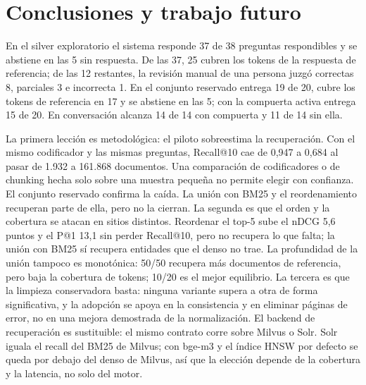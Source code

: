 \section{Conclusiones y trabajo futuro}
\label{sec:conclusiones}

En el silver exploratorio el sistema responde 37 de 38 preguntas respondibles y se abstiene en las 5 sin respuesta. De las 37, 25 cubren los tokens de la respuesta de referencia; de las 12 restantes, la revisi\'on manual de una persona juzg\'o correctas 8, parciales 3 e incorrecta 1. En el conjunto reservado entrega 19 de 20, cubre los tokens de referencia en 17 y se abstiene en las 5; con la compuerta activa entrega 15 de 20. En conversaci\'on alcanza 14 de 14 con compuerta y 11 de 14 sin ella.

La primera lecci\'on es metodol\'ogica: el piloto sobreestima la recuperaci\'on. Con el mismo codificador y las mismas preguntas, Recall@10 cae de 0,947 a 0,684 al pasar de 1.932 a 161.868 documentos. Una comparaci\'on de codificadores o de chunking hecha solo sobre una muestra peque\~na no permite elegir con confianza. El conjunto reservado confirma la ca\'ida. La uni\'on con BM25 y el reordenamiento recuperan parte de ella, pero no la cierran. La segunda es que el orden y la cobertura se atacan en sitios distintos. Reordenar el top-5 sube el nDCG 5,6 puntos y el P@1 13,1 sin perder Recall@10, pero no recupera lo que falta; la uni\'on con BM25 s\'i recupera entidades que el denso no trae. La profundidad de la uni\'on tampoco es monot\'onica: 50/50 recupera m\'as documentos de referencia, pero baja la cobertura de tokens; 10/20 es el mejor equilibrio. La tercera es que la limpieza conservadora basta: ninguna variante supera a otra de forma significativa, y la adopci\'on se apoya en la consistencia y en eliminar p\'aginas de error, no en una mejora demostrada de la normalizaci\'on. El backend de recuperaci\'on es sustituible: el mismo contrato corre sobre Milvus o Solr. Solr iguala el recall del BM25 de Milvus; con bge-m3 y el \'indice HNSW por defecto se queda por debajo del denso de Milvus, as\'i que la elecci\'on depende de la cobertura y la latencia, no solo del motor.

